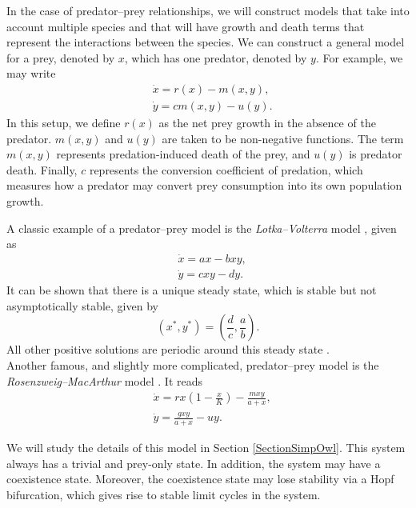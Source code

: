 \documentclass[12pt]{UOthesis}
\theoremstyle{remarkstyle}
\begin{document}
In the case of predator--prey relationships, we will construct models that take into account multiple species and that will have growth and death terms that represent the interactions between the species. We can construct a general model for a prey, denoted by $x$, which has one predator, denoted by $y$. For example, we may write
\begin{equation}
	\begin{split}
		&\dot{x}=r(x)-m(x,y),\\
		&\dot{y}=cm(x,y)-u(y).
	\end{split}
	\label{GeneralPredPreyModel}
\end{equation}
In this setup, we define $r(x)$ as the net prey growth in the absence of the predator. $m(x,y)$ and $u(y)$ are taken to be non-negative functions. The term $m(x,y)$ represents predation-induced death of the prey, and $u(y)$ is predator death. Finally, $c$ represents the conversion coefficient of predation, which measures how a predator may convert prey consumption into its own population growth.

A classic example of a predator--prey model is the \textit{Lotka--Volterra} model \cite{Lotka}, given as
\begin{equation}
	\begin{split}
		&\dot{x}=ax-bxy,\\
		&\dot{y}=cxy-dy.
	\end{split}
	\label{LotkaVolterra}
\end{equation}
It can be shown that there is a unique steady state, which is stable but not asymptotically stable, given by
$$(x^*,y^*)=\left(\frac{d}{c},\frac{a}{b}\right).$$
All other positive solutions are periodic around this steady state \cite{Kot}.\\

Another famous, and slightly more complicated, predator--prey model is the \textit{Rosenzweig--MacArthur} model \cite{Kot, RosMac}. It reads
\begin{equation}
	\begin{split}
		&\dot{x}=rx\left(1-\frac{x}{K}\right)-\frac{mxy}{a+x},\\
		&\dot{y}=\frac{gxy}{a+x}-uy.
	\end{split}
	\label{RosMac}
\end{equation}

We will study the details of this model in Section \ref{SectionSimpOwl}. This system always has a trivial and prey-only state. In addition, the system may have a coexistence state. Moreover, the coexistence state may lose stability via a Hopf bifurcation, which gives rise to stable limit cycles in the system.\\
\end{document}
